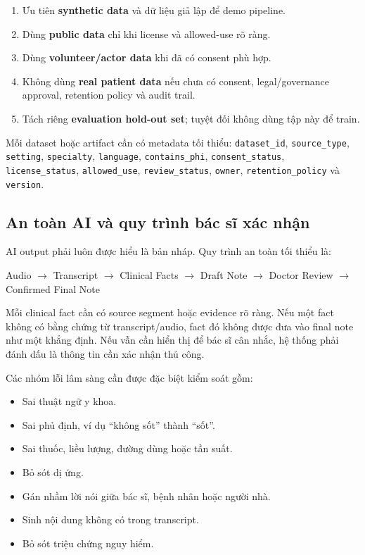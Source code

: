 \documentclass[12pt,a4paper]{article}
\begin{document}
\begin{enumerate}
    \item Ưu tiên \textbf{synthetic data} và dữ liệu giả lập để demo pipeline.
    \item Dùng \textbf{public data} chỉ khi license và allowed-use rõ ràng.
    \item Dùng \textbf{volunteer/actor data} khi đã có consent phù hợp.
    \item Không dùng \textbf{real patient data} nếu chưa có consent, legal/governance approval, retention policy và audit trail.
    \item Tách riêng \textbf{evaluation hold-out set}; tuyệt đối không dùng tập này để train.
\end{enumerate}

Mỗi dataset hoặc artifact cần có metadata tối thiểu: \texttt{dataset\_id}, \texttt{source\_type}, \texttt{setting}, \texttt{specialty}, \texttt{language}, \texttt{contains\_phi}, \texttt{consent\_status}, \texttt{license\_status}, \texttt{allowed\_use}, \texttt{review\_status}, \texttt{owner}, \texttt{retention\_policy} và \texttt{version}.

\subsection{An toàn AI và quy trình bác sĩ xác nhận}

AI output phải luôn được hiểu là bản nháp. Quy trình an toàn tối thiểu là:

\begin{center}
Audio $\rightarrow$ Transcript $\rightarrow$ Clinical Facts $\rightarrow$ Draft Note $\rightarrow$ Doctor Review $\rightarrow$ Confirmed Final Note
\end{center}

Mỗi clinical fact cần có source segment hoặc evidence rõ ràng. Nếu một fact không có bằng chứng từ transcript/audio, fact đó không được đưa vào final note như một khẳng định. Nếu vẫn cần hiển thị để bác sĩ cân nhắc, hệ thống phải đánh dấu là thông tin cần xác nhận thủ công.

Các nhóm lỗi lâm sàng cần được đặc biệt kiểm soát gồm:

\begin{itemize}
    \item Sai thuật ngữ y khoa.
    \item Sai phủ định, ví dụ ``không sốt'' thành ``sốt''.
    \item Sai thuốc, liều lượng, đường dùng hoặc tần suất.
    \item Bỏ sót dị ứng.
    \item Gán nhầm lời nói giữa bác sĩ, bệnh nhân hoặc người nhà.
    \item Sinh nội dung không có trong transcript.
    \item Bỏ sót triệu chứng nguy hiểm.
\end{itemize}
\end{document}
